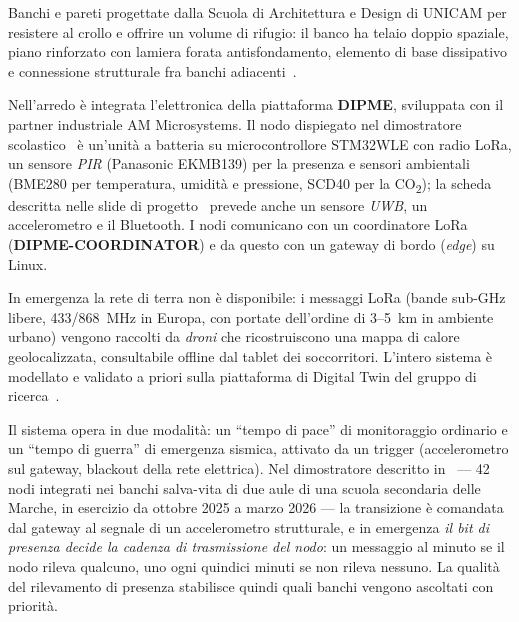 \begin{description}[leftmargin=1.4em,style=nextline]
  \item[Arredi salva-vita] Banchi e pareti progettate dalla Scuola di Architettura
    e Design di UNICAM per resistere al crollo e offrire un volume di rifugio: il
    banco ha telaio doppio spaziale, piano rinforzato con lamiera forata
    antisfondamento, elemento di base dissipativo e connessione strutturale fra
    banchi adiacenti~\cite{pietroni2021furniture}.
  \item[Nodi di sensing] Nell'arredo è integrata l'elettronica della piattaforma
    \textbf{DIPME}, sviluppata con il partner industriale AM Microsystems. Il nodo
    dispiegato nel dimostratore scolastico~\cite{callisto2026dipme} è un'unità a
    batteria su microcontrollore STM32WLE con radio LoRa, un sensore \emph{PIR}
    (Panasonic EKMB139) per la presenza e sensori ambientali (BME280 per
    temperatura, umidità e pressione, SCD40 per la CO\textsubscript{2}); la scheda
    descritta nelle slide di progetto~\cite{slideUprise} prevede anche un sensore
    \emph{UWB}, un accelerometro e il Bluetooth. I nodi comunicano con un
    coordinatore LoRa (\textbf{DIPME-COORDINATOR}) e da questo con un gateway di
    bordo (\emph{edge}) su Linux.
  \item[Raccolta e visualizzazione] In emergenza la rete di terra non è
    disponibile: i messaggi LoRa (bande sub-GHz libere, 433/868~MHz in Europa,
    con portate dell'ordine di 3--5~km in ambiente urbano) vengono raccolti da
    \emph{droni} che ricostruiscono una mappa di calore geolocalizzata, consultabile
    offline dal tablet dei soccorritori. L'intero sistema è modellato e validato
    a priori sulla piattaforma di Digital Twin del gruppo di
    ricerca~\cite{callisto2023dt,unicamDT}.
\end{description}

Il sistema opera in due modalità: un ``tempo di pace'' di monitoraggio ordinario
e un ``tempo di guerra'' di emergenza sismica, attivato da un trigger (accelerometro
sul gateway, blackout della rete elettrica). Nel dimostratore descritto
in~\cite{callisto2026dipme} --- 42 nodi integrati nei banchi salva-vita di due aule
di una scuola secondaria delle Marche, in esercizio da ottobre 2025 a marzo 2026 ---
la transizione è comandata dal gateway al segnale di un accelerometro strutturale, e
in emergenza \emph{il bit di presenza decide la cadenza di trasmissione del nodo}: un
messaggio al minuto se il nodo rileva qualcuno, uno ogni quindici minuti se non rileva
nessuno. La qualità del rilevamento di presenza stabilisce quindi quali banchi vengono
ascoltati con priorità.

